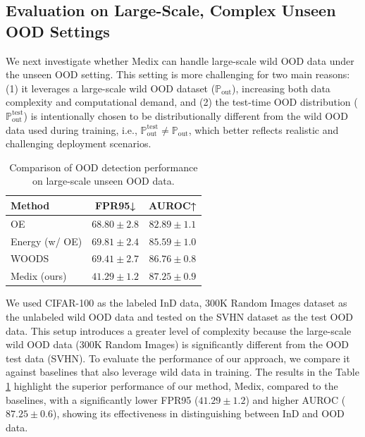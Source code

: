 \documentclass[10pt]{article} %
\theoremstyle{plain}
\theoremstyle{definition}
\begin{document}
\subsection{Evaluation on Large-Scale, Complex Unseen OOD Settings} \label{appendix:large-scale-unseen}
We next investigate whether Medix can handle large-scale wild OOD data under the unseen OOD setting. This setting is more challenging for two main reasons: (1) it leverages a large-scale wild OOD dataset (\( \mathbb{P}_{\text{out}} \)), increasing both data complexity and computational demand, and (2) the test-time OOD distribution (\( \mathbb{P}_{\text{out}}^{\text{test}} \)) is intentionally chosen to be distributionally different from the wild OOD data used during training, i.e., \( \mathbb{P}_{\text{out}}^{\text{test}} \neq \mathbb{P}_{\text{out}} \), which better reflects realistic and challenging deployment scenarios.
\begin{table}
\centering
\caption{Comparison of OOD detection performance on large-scale unseen OOD data.}
\footnotesize
\begin{tabular}{lcc}
\toprule
Method & FPR95↓ & AUROC↑ \\
\midrule
OE & $68.80 \pm 2.8$ & $82.89 \pm 1.1$ \\
Energy (w/ OE) & $69.81 \pm 2.4$ & $85.59 \pm 1.0$ \\
WOODS & $69.41 \pm 2.7$ & $86.76 \pm 0.8$ \\
Medix (ours) & $\mathbf{41.29 \pm 1.2}$ & $\mathbf{87.25 \pm 0.9}$ \\
\bottomrule
\end{tabular}
\label{tab:large_scale_ood}
\end{table}
We used CIFAR-100 as the labeled InD data, 300K Random Images dataset \cite{hendrycks2018deep} as the unlabeled wild OOD data and tested on the SVHN dataset as the test OOD data.
This setup introduces a greater level of complexity because the large-scale wild OOD data (300K Random Images) is significantly different from the OOD test data (SVHN). 
To evaluate the performance of our approach, we compare it against baselines that also leverage wild data in training. The results in the Table \ref{tab:large_scale_ood} highlight the superior performance of our method, Medix, compared to the baselines, with a significantly lower FPR95 (\(41.29 \pm 1.2\)) and higher AUROC (\(87.25 \pm 0.6\)), showing its effectiveness in distinguishing between InD and OOD data.
\end{document}
